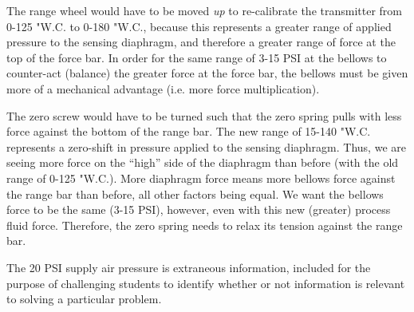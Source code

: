 





The range wheel would have to be moved {\it up} to re-calibrate the transmitter from 0-125 "W.C. to 0-180 "W.C., because this represents a greater range of applied pressure to the sensing diaphragm, and therefore a greater range of force at the top of the force bar.  In order for the same range of 3-15 PSI at the bellows to counter-act (balance) the greater force at the force bar, the bellows must be given more of a mechanical advantage (i.e. more force multiplication).

\vskip 10pt

The zero screw would have to be turned such that the zero spring pulls with less force against the bottom of the range bar.  The new range of 15-140 "W.C. represents a zero-shift in pressure applied to the sensing diaphragm.  Thus, we are seeing more force on the ``high'' side of the diaphragm than before (with the old range of 0-125 "W.C.).  More diaphragm force means more bellows force against the range bar than before, all other factors being equal.  We want the bellows force to be the same (3-15 PSI), however, even with this new (greater) process fluid force.  Therefore, the zero spring needs to relax its tension against the range bar.

\vskip 10pt

The 20 PSI supply air pressure is extraneous information, included for the purpose of challenging students to identify whether or not information is relevant to solving a particular problem.




